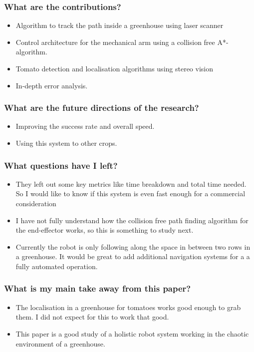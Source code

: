    \subsubsection*{What are the contributions?}
    \begin{itemize}
        \item Algorithm to track the path inside a greenhouse using laser scanner 
        \item Control architecture for the mechanical arm using a collision free A*-algorithm.
        \item Tomato detection and localisation algorithms using stereo vision
        \item In-depth error analysis.
    \end{itemize}
    \subsubsection*{What are the future directions of the research?} 
    \begin{itemize}
        \item Improving the success rate and overall speed.
        \item Using this system to other crops.
    \end{itemize}
    \subsubsection*{What questions have I left?}
    \begin{itemize}
        \item They left out some key metrics like time breakdown and total time needed. So I would like to know if this system is even fast enough for a commercial consideration
        \item I have not fully understand how the collision free path finding algorithm for the end-effector works, so this is something to study next.
        \item Currently the robot is only following along the space in between two rows in a greenhouse. It would be great to add additional navigation systems for a a fully automated operation.
    \end{itemize}
    \subsubsection*{What is my main take away from this paper?} 
    \begin{itemize}
        \item The localisation in a greenhouse for tomatoes works good enough to grab them.  I did not expect for this to work that good.
        \item This paper is a good study of a holistic robot system working in the chaotic environment of a greenhouse.
    \end{itemize}
    
